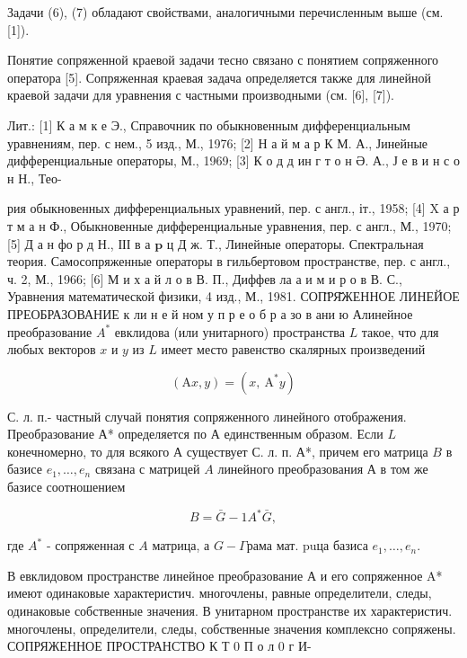 \documentclass[10pt]{article}
\begin{document}
Задачи (6), (7) обладают свойствами, аналогичными перечисленным выше (см. [1]).



Понятие сопряженной краевой задачи тесно связано с понятием сопряженного оператора [5]. Сопряженная краевая задача определяется также для линейной краевой задачи для уравнения с частными производными (см. [6], [7]).



Лит.: [1] К а м к е Э., Справочник по обыкновенным дифференциальным уравнениям, пер. с нем., 5 изд., М., 1976; [2] Н а й м а р К М. А., Јинейные дифференциальные операторы, М., 1969; [3] К о д д ин г т о н Ә. А., Ј е в и н с о н Н., Тео-

рия обыкновенных дифференциальных уравнений, пер. с англ., іт., 1958; [4] X а р т м а н Ф., Обыкновенные дифференциальные уравнения, пер. с англ., М., 1970; [5] Д а н фо р д Н., ІІІ в а $\mathbf{p}$ ц Д ж. Т., Линейные операторы. Спектральная теория. Самосопряженные операторы в гильбертовом пространстве, пер. с англ., ч. 2, М., 1966; [6] М и х а й л о в В. П., Диффев ла а и м и р о в В. С., Уравнения математической физики, 4 изд., М., 1981. СОП̈РЯ̆ЖЕННОЕ ЛИНЕЙОЕ ПРЕОБРАЗОВАНИЕ к ли н е й ном у п р е о б р а зо в ани ю Алинейное преобразование $A^{*}$ евклидова (или унитарного) пространства $L$ такое, что для любых векторов $x$ и $y$ из $L$ имеет место равенство скалярных произведений



\[

(\mathrm{A} x, y)=\left(x, \mathrm{~A}^{*} y\right)

\]



С. л. п.- частный случай понятия сопряженного линейного отображения. Преобразование А* определяется по А единственным образом. Если $L$ конечномерно, то для всякого А существует С. л. п. А*, причем его матрица $B$ в базисе $e_{1}, \ldots, e_{n}$ связана с матрицей $A$ линейного преобразования А в том же базисе соотношением



\[

B=\bar{G}-1 A^{*} \bar{G},

\]



где $A^{*}$ - сопряженная с $A$ матрица, а $G-\Gamma р а м а$ мат. puца базиса $e_{1}, \ldots, e_{n}$.



В евклидовом пространстве линейное преобразование А и его сопряженное A* имеют одинаковые характеристич. многочлены, равные определители, следы, одинаковые собственные значения. В унитарном пространстве их характеристич. многочлены, определители, следы, собственные значения комплексно сопряжены. СОПРЯЖЕННОЕ ПРОСТРАНСТВО К Т 0 П $о$ л 0 г И-
\end{document}
